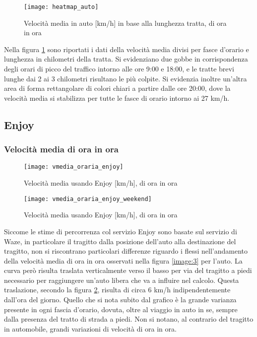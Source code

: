 \begin{figure}[H]
\texttt{[image: heatmap\_auto]}
\caption{Velocità media in auto [km/h] in base alla lunghezza tratta, di ora in ora}
\label{image:6}
\end{figure}

Nella figura \ref{image:6} sono riportati i dati della velocità media divisi per fasce d'orario e lunghezza in chilometri della tratta. Si evidenziano due gobbe in corrispondenza degli orari di picco del traffico intorno alle ore 9:00 e 18:00, e le tratte brevi lunghe dai 2 ai 3 chilometri risultano le più colpite. Si evidenzia inoltre un'altra area di forma rettangolare di colori chiari a partire dalle ore 20:00, dove la velocità media si stabilizza per tutte le fasce di orario intorno ai 27 km/h.

\subsection{Enjoy}

\subsubsection{Velocità media di ora in ora}

\begin{figure}[H]
\texttt{[image: vmedia\_oraria\_enjoy]}
\caption{Velocità media usando Enjoy [km/h], di ora in ora}
\label{image:7}
\end{figure}

\begin{figure}[H]
	\texttt{[image: vmedia\_oraria\_enjoy\_weekend]}
	\caption{Velocità media usando Enjoy [km/h], di ora in ora}
	\label{image:20}
\end{figure}

Siccome le stime di percorrenza col servizio Enjoy sono basate sul servizio di Waze, in particolare il tragitto dalla posizione dell'auto alla destinazione del tragitto, non si riscontrano particolari differenze riguardo i flessi nell'andamento della velocità media di ora in ora osservati nella figura \ref{image:3} per l'auto. La curva però risulta traslata verticalmente verso il basso per via del tragitto a piedi necessario per raggiungere un'auto libera che va a influire nel calcolo. Questa traslazione, secondo la figura \ref{image:7}, risulta di circa 6 km/h indipendentemente dall'ora del giorno. Quello che si nota subito dal grafico è la grande varianza presente in ogni fascia d'orario, dovuta, oltre al viaggio in auto in se, sempre dalla presenza del tratto di strada a piedi. Non si notano, al contrario del tragitto in automobile, grandi variazioni di velocità di ora in ora.

